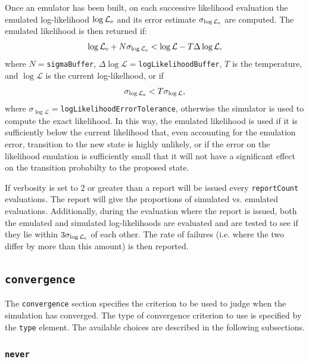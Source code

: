 Once an emulator has been built, on each successive likelihood evaluation the emulated log-likelihood $\log\mathcal{L}_{\rm e}$ and its error estimate $\sigma_{\log\mathcal{L}_{\rm e}}$ are computed. The emulated likelihood is then returned if:
\begin{equation}
\log\mathcal{L}_{\rm e} + N \sigma_{\log\mathcal{L}_{\rm e}} < \log\mathcal{L} - T \Delta\log\mathcal{L},
\end{equation}
where $N=${\tt sigmaBuffer}, $\Delta\log\mathcal{L}=${\tt logLikelihoodBuffer}, $T$ is the temperature, and $\log\mathcal{L}$ is the current log-likelhood, or if
\begin{equation}
\sigma_{\log\mathcal{L}_{\rm e}} < T \sigma_{\log\mathcal{L}},
\end{equation}
where $\sigma_{\log\mathcal{L}}=${\tt logLikelihoodErrorTolerance}, otherwise the simulator is used to compute the exact likelihood. In this way, the emulated likelihood is used if it is sufficiently below the current likelihood that, even accounting for the emulation error, transition to the new state is highly unlikely, or if the error on the likelihood emulation is sufficiently small that it will not have a significant effect on the transition probabilty to the proposed state.

If verbosity is set to 2 or greater than a report will be issued every {\tt reportCount} evaluations. The report will give the proportions of simulated vs. emulated evaluations. Additionally, during the evaluation where the report is issued, both the emulated and simulated log-likelihoods are evaluated and are tested to see if they lie within $3 \sigma_{\log\mathcal{L}_{\rm e}}$ of each other. The rate of failures (i.e. where the two differ by more than this amount) is then reported.

\subsection{{\tt convergence}}

The {\tt convergence} section specifies the criterion to be used to judge when the simulation has converged. The type of convergence criterion to use is specified by the {\tt type} element. The available choices are described in the following subsections.

\subsubsection{{\tt never}}

